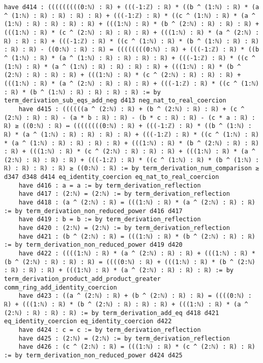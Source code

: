 \documentclass{article}
\begin{document}
\begin{tcolorbox}[colback=white!10, width=\linewidth]
\begin{lstlisting}[language=Lean4]
    have d414 : (((((((((0:ℕ) : ℝ) + (((-1:ℤ) : ℝ) * ((b ^ (1:ℕ) : ℝ) * (a ^ (1:ℕ) : ℝ) : ℝ) : ℝ) : ℝ) + (((-1:ℤ) : ℝ) * ((c ^ (1:ℕ) : ℝ) * (a ^ (1:ℕ) : ℝ) : ℝ) : ℝ) : ℝ) + (((1:ℕ) : ℝ) * (b ^ (2:ℕ) : ℝ) : ℝ) : ℝ) + (((1:ℕ) : ℝ) * (c ^ (2:ℕ) : ℝ) : ℝ) : ℝ) + (((1:ℕ) : ℝ) * (a ^ (2:ℕ) : ℝ) : ℝ) : ℝ) + (((-1:ℤ) : ℝ) * ((c ^ (1:ℕ) : ℝ) * (b ^ (1:ℕ) : ℝ) : ℝ) : ℝ) : ℝ) - ((0:ℕ) : ℝ) : ℝ) = ((((((((0:ℕ) : ℝ) + (((-1:ℤ) : ℝ) * ((b ^ (1:ℕ) : ℝ) * (a ^ (1:ℕ) : ℝ) : ℝ) : ℝ) : ℝ) + (((-1:ℤ) : ℝ) * ((c ^ (1:ℕ) : ℝ) * (a ^ (1:ℕ) : ℝ) : ℝ) : ℝ) : ℝ) + (((1:ℕ) : ℝ) * (b ^ (2:ℕ) : ℝ) : ℝ) : ℝ) + (((1:ℕ) : ℝ) * (c ^ (2:ℕ) : ℝ) : ℝ) : ℝ) + (((1:ℕ) : ℝ) * (a ^ (2:ℕ) : ℝ) : ℝ) : ℝ) + (((-1:ℤ) : ℝ) * ((c ^ (1:ℕ) : ℝ) * (b ^ (1:ℕ) : ℝ) : ℝ) : ℝ) : ℝ) := by term_derivation_sub_eqs_add_neg d413 neg_nat_to_real_coercion
    have d415 : ((((((a ^ (2:ℕ) : ℝ) + (b ^ (2:ℕ) : ℝ) : ℝ) + (c ^ (2:ℕ) : ℝ) : ℝ) - (a * b : ℝ) : ℝ) - (b * c : ℝ) : ℝ) - (c * a : ℝ) : ℝ) ≥ ((0:ℕ) : ℝ) ↔ ((((((((0:ℕ) : ℝ) + (((-1:ℤ) : ℝ) * ((b ^ (1:ℕ) : ℝ) * (a ^ (1:ℕ) : ℝ) : ℝ) : ℝ) : ℝ) + (((-1:ℤ) : ℝ) * ((c ^ (1:ℕ) : ℝ) * (a ^ (1:ℕ) : ℝ) : ℝ) : ℝ) : ℝ) + (((1:ℕ) : ℝ) * (b ^ (2:ℕ) : ℝ) : ℝ) : ℝ) + (((1:ℕ) : ℝ) * (c ^ (2:ℕ) : ℝ) : ℝ) : ℝ) + (((1:ℕ) : ℝ) * (a ^ (2:ℕ) : ℝ) : ℝ) : ℝ) + (((-1:ℤ) : ℝ) * ((c ^ (1:ℕ) : ℝ) * (b ^ (1:ℕ) : ℝ) : ℝ) : ℝ) : ℝ) ≥ ((0:ℕ) : ℝ) := by term_derivation_num_comparison ≥ d347 d348 d414 eq_identity_coercion eq_nat_to_real_coercion
    have d416 : a = a := by term_derivation_reflection
    have d417 : (2:ℕ) = (2:ℕ) := by term_derivation_reflection
    have d418 : (a ^ (2:ℕ) : ℝ) = (((1:ℕ) : ℝ) * (a ^ (2:ℕ) : ℝ) : ℝ) := by term_derivation_non_reduced_power d416 d417
    have d419 : b = b := by term_derivation_reflection
    have d420 : (2:ℕ) = (2:ℕ) := by term_derivation_reflection
    have d421 : (b ^ (2:ℕ) : ℝ) = (((1:ℕ) : ℝ) * (b ^ (2:ℕ) : ℝ) : ℝ) := by term_derivation_non_reduced_power d419 d420
    have d422 : ((((1:ℕ) : ℝ) * (a ^ (2:ℕ) : ℝ) : ℝ) + (((1:ℕ) : ℝ) * (b ^ (2:ℕ) : ℝ) : ℝ) : ℝ) = ((((0:ℕ) : ℝ) + (((1:ℕ) : ℝ) * (b ^ (2:ℕ) : ℝ) : ℝ) : ℝ) + (((1:ℕ) : ℝ) * (a ^ (2:ℕ) : ℝ) : ℝ) : ℝ) := by term_derivation_product_add_product_greater comm_ring_add_identity_coercion
    have d423 : ((a ^ (2:ℕ) : ℝ) + (b ^ (2:ℕ) : ℝ) : ℝ) = ((((0:ℕ) : ℝ) + (((1:ℕ) : ℝ) * (b ^ (2:ℕ) : ℝ) : ℝ) : ℝ) + (((1:ℕ) : ℝ) * (a ^ (2:ℕ) : ℝ) : ℝ) : ℝ) := by term_derivation_add_eq d418 d421 eq_identity_coercion eq_identity_coercion d422
    have d424 : c = c := by term_derivation_reflection
    have d425 : (2:ℕ) = (2:ℕ) := by term_derivation_reflection
    have d426 : (c ^ (2:ℕ) : ℝ) = (((1:ℕ) : ℝ) * (c ^ (2:ℕ) : ℝ) : ℝ) := by term_derivation_non_reduced_power d424 d425

\end{lstlisting}
\end{tcolorbox}
\end{document}

